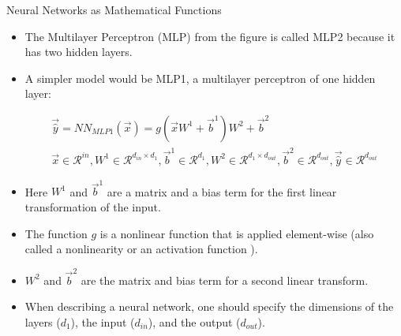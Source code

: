 \documentclass[handout]{beamer}
\begin{document}
\begin{frame}{Neural Networks as Mathematical Functions}
\begin{scriptsize}
\begin{itemize}
\item The Multilayer Perceptron (MLP) from the figure is called MLP2 because it has two hidden layers.
\item A simpler model would be MLP1, a multilayer perceptron of one hidden layer:
\begin{center}
\begin{equation}
\begin{split}
\vec{\hat{y}} = NN_{MLP1}(\vec{x}) = g(\vec{x}W^{1}+\vec{b}^{1})W^{2}+\vec{b}^{2} \\
\vec{x} \in \mathcal{R}^{in}, W^{1} \in \mathcal{R}^{d_{in}\times d_{1}}, \vec{b}^{1} \in \mathcal{R}^{d_{1}}, W^{2} \in \mathcal{R}^{d_{1}\times d_{out}}, \vec{b}^{2} \in \mathcal{R}^{d_{out}}, \vec{\hat{y}} \in \mathcal{R}^{d_{out}}    
\end{split}
\end{equation}
\end{center}

\item Here $W^{1}$ and $\vec{b}^{1}$ are a matrix and a bias term for the first linear transformation of the input.
\item The function $g$ is a nonlinear function that is applied element-wise (also called a nonlinearity or an activation function ).
\item $W^{2}$ and $\vec{b}^{2}$ are the matrix and bias term for a second linear transform.

\item When describing a neural network, one should specify the dimensions of the layers ($d_{1}$), the input ($d_{in}$), and the output ($d_{out}$).
\end{itemize}


\end{scriptsize}
\end{frame}
\end{document}
